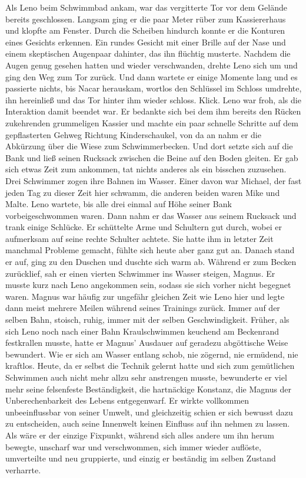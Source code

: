 \documentclass[ngerman,smalldemyvopaper,11pt,oneside,onecolumn,openright,extrafontsizes]{memoir}
\begin{document}
Als Leno beim Schwimmbad ankam, war das vergitterte Tor vor dem Gelände bereits geschlossen. Langsam ging er die paar Meter rüber zum Kassiererhaus und klopfte am Fenster. Durch die Scheiben hindurch konnte er die Konturen eines Gesichts erkennen. Ein rundes Gesicht mit einer Brille auf der Nase und einem skeptischen Augenpaar dahinter, das ihn flüchtig musterte. Nachdem die Augen genug gesehen hatten und wieder verschwanden, drehte Leno sich um und ging den Weg zum Tor zurück. Und dann wartete er einige Momente lang und es passierte nichts, bis Nacar herauskam, wortlos den Schlüssel im Schloss umdrehte, ihn hereinließ und das Tor hinter ihm wieder schloss. Klick. Leno war froh, als die Interaktion damit beendet war. Er bedankte sich bei dem ihm bereits den Rücken zukehrenden grummeligen Kassier und machte ein paar schnelle Schritte auf dem gepflasterten Gehweg Richtung Kinderschaukel, von da an nahm er die Abkürzung über die Wiese zum Schwimmerbecken. Und dort setzte sich auf die Bank und ließ seinen Rucksack zwischen die Beine auf den Boden gleiten. Er gab sich etwas Zeit zum ankommen, tat nichts anderes als ein bisschen zuzusehen. Drei Schwimmer zogen ihre Bahnen im Wasser. Einer davon war Michael, der fast jeden Tag zu dieser Zeit hier schwamm, die anderen beiden waren Mike und Malte. Leno wartete, bis alle drei einmal auf Höhe seiner Bank vorbeigeschwommen waren. Dann nahm er das Wasser aus seinem Rucksack und trank einige Schlücke. Er schüttelte Arme und Schultern gut durch, wobei er aufmerksam auf seine rechte Schulter achtete. Sie hatte ihm in letzter Zeit manchmal Probleme gemacht, fühlte sich heute aber ganz gut an. Danach stand er auf, ging zu den Duschen und duschte sich warm ab. Während er zum Becken zurücklief, sah er einen vierten Schwimmer ins Wasser steigen, Magnus. Er musste kurz nach Leno angekommen sein, sodass sie sich vorher nicht begegnet waren. Magnus war häufig zur ungefähr gleichen Zeit wie Leno hier und legte dann meist mehrere Meilen während seines Trainings zurück. Immer auf der selben Bahn, stoisch, ruhig, immer mit der selben Geschwindigkeit. Früher, als sich Leno noch nach einer Bahn Kraulschwimmen keuchend am Beckenrand festkrallen musste, hatte er Magnus' Ausdauer auf geradezu abgöttische Weise bewundert. Wie er sich am Wasser entlang schob, nie zögernd, nie ermüdend, nie kraftlos. Heute, da er selbst die Technik gelernt hatte und sich zum gemütlichen Schwimmen auch nicht mehr allzu sehr anstrengen musste, bewunderte er viel mehr seine felsenfeste Beständigkeit, die hartnäckige Konstanz, die Magnus der Unberechenbarkeit des Lebens entgegenwarf. Er wirkte vollkommen unbeeinflussbar von seiner Umwelt, und gleichzeitig schien er sich bewusst dazu zu entscheiden, auch seine Innenwelt keinen Einfluss auf ihn nehmen zu lassen. Als wäre er der einzige Fixpunkt, während sich alles andere um ihn herum bewegte, unscharf war und verschwommen, sich immer wieder auflöste, umverteilte und neu gruppierte, und einzig er beständig im selben Zustand verharrte.
\end{document}
